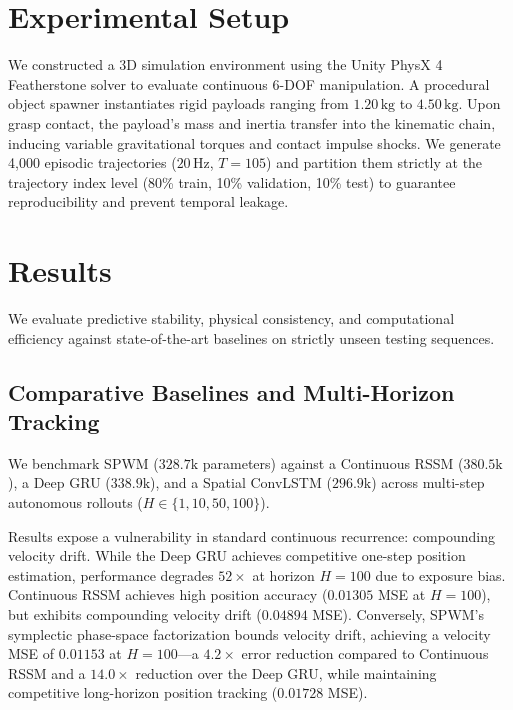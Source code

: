 \documentclass{article}
\begin{document}
\section{Experimental Setup}

We constructed a 3D simulation environment using the Unity PhysX 4 Featherstone solver \cite{physx2022} to evaluate continuous 6-DOF manipulation. A procedural object spawner instantiates rigid payloads ranging from $1.20\,\text{kg}$ to $4.50\,\text{kg}$. Upon grasp contact, the payload's mass and inertia transfer into the kinematic chain, inducing variable gravitational torques and contact impulse shocks. We generate 4,000 episodic trajectories ($20\,\text{Hz}$, $T=105$) and partition them strictly at the trajectory index level (80\% train, 10\% validation, 10\% test) to guarantee reproducibility and prevent temporal leakage. 

\begin{table}[h]
\centering
\caption{[INSERT TABLE: Dataset Partitioning and Velocity Domain Bounds. Detail the splits and velocity bounds.]}\label{tab:dataset_splits}
\end{table}

\section{Results}

We evaluate predictive stability, physical consistency, and computational efficiency against state-of-the-art baselines on strictly unseen testing sequences.

\subsection{Comparative Baselines and Multi-Horizon Tracking}
We benchmark SPWM ($328.7\text{k}$ parameters) against a Continuous RSSM \cite{hafner2025dreamerv3} ($380.5\text{k}$), a Deep GRU \cite{cho2014learning} ($338.9\text{k}$), and a Spatial ConvLSTM \cite{shi2015convolutional} ($296.9\text{k}$) across multi-step autonomous rollouts ($H \in \{1, 10, 50, 100\}$). 

Results expose a vulnerability in standard continuous recurrence: compounding velocity drift. While the Deep GRU achieves competitive one-step position estimation, performance degrades $52\times$ at horizon $H=100$ due to exposure bias. Continuous RSSM achieves high position accuracy ($0.01305$ MSE at $H=100$), but exhibits compounding velocity drift ($0.04894$ MSE). Conversely, SPWM's symplectic phase-space factorization bounds velocity drift, achieving a velocity MSE of $0.01153$ at $H=100$—a $4.2\times$ error reduction compared to Continuous RSSM and a $14.0\times$ reduction over the Deep GRU, while maintaining competitive long-horizon position tracking ($0.01728$ MSE).
\end{document}
